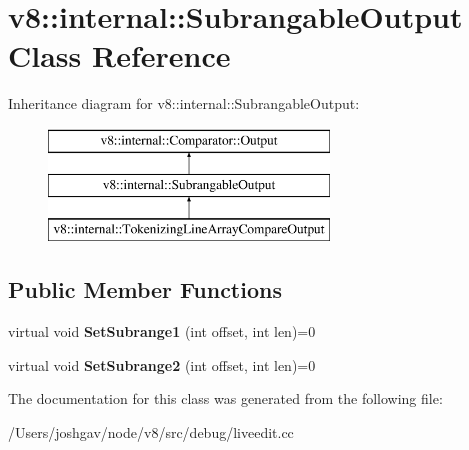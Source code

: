 \hypertarget{classv8_1_1internal_1_1_subrangable_output}{}\section{v8\+:\+:internal\+:\+:Subrangable\+Output Class Reference}
\label{classv8_1_1internal_1_1_subrangable_output}
Inheritance diagram for v8\+:\+:internal\+:\+:Subrangable\+Output\+:\begin{figure}[H]
\begin{center}
\leavevmode
\includegraphics[height=3.000000cm]{classv8_1_1internal_1_1_subrangable_output}
\end{center}
\end{figure}
\subsection*{Public Member Functions}
\begin{DoxyCompactItemize}
\item 
virtual void {\bfseries Set\+Subrange1} (int offset, int len)=0\hypertarget{classv8_1_1internal_1_1_subrangable_output_a3abce952c0063fb9cd020ddc77fa4eab}{}\label{classv8_1_1internal_1_1_subrangable_output_a3abce952c0063fb9cd020ddc77fa4eab}

\item 
virtual void {\bfseries Set\+Subrange2} (int offset, int len)=0\hypertarget{classv8_1_1internal_1_1_subrangable_output_a55616c6bcf552ceeb3eb3310a1841c72}{}\label{classv8_1_1internal_1_1_subrangable_output_a55616c6bcf552ceeb3eb3310a1841c72}

\end{DoxyCompactItemize}


The documentation for this class was generated from the following file\+:\begin{DoxyCompactItemize}
\item 
/\+Users/joshgav/node/v8/src/debug/liveedit.\+cc\end{DoxyCompactItemize}
